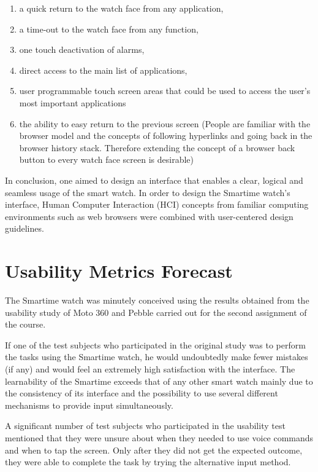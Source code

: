 \documentclass{article}
\begin{document}
\begin{enumerate}
\item a quick return to the watch face from any application, 
\item a time-out to the watch face from any function,
\item one touch deactivation of alarms, 
\item direct access to the main list of applications, 
\item user programmable touch screen areas that could be used to access the user's most important applications
\item the ability to easy return to the previous screen (People are familiar with the browser model and the concepts of following hyperlinks and going back in the browser history stack. Therefore extending the concept of a browser back button to every watch face screen is desirable)
\end{enumerate}

In conclusion, one aimed to design an interface that enables a clear, logical and seamless usage of the smart watch. In order to design the Smartime watch's interface, Human Computer Interaction (HCI) concepts from familiar computing environments such as web browsers were combined with user-centered design guidelines.


\section{Usability Metrics Forecast}
The Smartime watch was minutely conceived using the results obtained from the usability study of Moto 360 and Pebble carried out for the second assignment of the course. 

If one of the test subjects who participated in the original study was to perform the tasks using the Smartime watch, he would undoubtedly make fewer mistakes (if any) and would feel an extremely high satisfaction with the interface. The learnability of the Smartime exceeds that of any other smart watch mainly due to the consistency of its interface and the possibility to use several different mechanisms to provide input simultaneously. 

A significant number of test subjects who participated in the usability test mentioned that they were unsure about when they needed to use voice commands and when to tap the screen. Only after they did not get the expected outcome, they were able to complete the task by trying the alternative input method.
\end{document}
